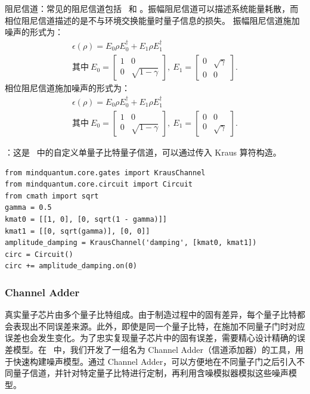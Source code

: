 阻尼信道：常见的阻尼信道包括 \AmplitudeDampingChannel\ 和 \PhaseDampingChannel。振幅阻尼信道可以描述系统能量耗散，而相位阻尼信道描述的是不与环境交换能量时量子信息的损失。
振幅阻尼信道施加噪声的形式为：
\begin{gather*}
    \epsilon(\rho) = E_0 \rho E_0^\dagger + E_1 \rho E_1^\dagger
    \\
    \text{其中}\ {E_0}=\begin{bmatrix}1 & 0               \\
        0 & \sqrt{1-\gamma}\end{bmatrix},
    \ {E_1}=\begin{bmatrix}0 & \sqrt{\gamma} \\
        0 & 0\end{bmatrix}.
\end{gather*}
相位阻尼信道施加噪声的形式为：
\begin{gather*}
    \epsilon(\rho) = E_0 \rho E_0^\dagger + E_1 \rho E_1^\dagger
    \\
    \text{其中}\ {E_0}=\begin{bmatrix}1 & 0               \\
        0 & \sqrt{1-\gamma}\end{bmatrix},
    \ {E_1}=\begin{bmatrix}0 & 0             \\
        0 & \sqrt{\gamma}\end{bmatrix}.
\end{gather*}

\KrausChannel：这是 \MindQuantum\ 中的自定义单量子比特量子信道，可以通过传入 Kraus 算符构造。
\begin{lstlisting}
from mindquantum.core.gates import KrausChannel
from mindquantum.core.circuit import Circuit
from cmath import sqrt
gamma = 0.5
kmat0 = [[1, 0], [0, sqrt(1 - gamma)]]
kmat1 = [[0, sqrt(gamma)], [0, 0]]
amplitude_damping = KrausChannel('damping', [kmat0, kmat1])
circ = Circuit()
circ += amplitude_damping.on(0)
\end{lstlisting}

\subsubsection{Channel Adder}
真实量子芯片由多个量子比特组成。由于制造过程中的固有差异，每个量子比特都会表现出不同误差来源。此外，即使是同一个量子比特，在施加不同量子门时对应误差也会发生变化。为了忠实复现量子芯片中的固有误差，需要精心设计精确的误差模型。在 \MindQuantum\ 中，我们开发了一组名为 Channel Adder（信道添加器）的工具，用于快速构建噪声模型。通过 Channel Adder，可以方便地在不同量子门之后引入不同量子信道，并针对特定量子比特进行定制，再利用含噪模拟器模拟这些噪声模型。

